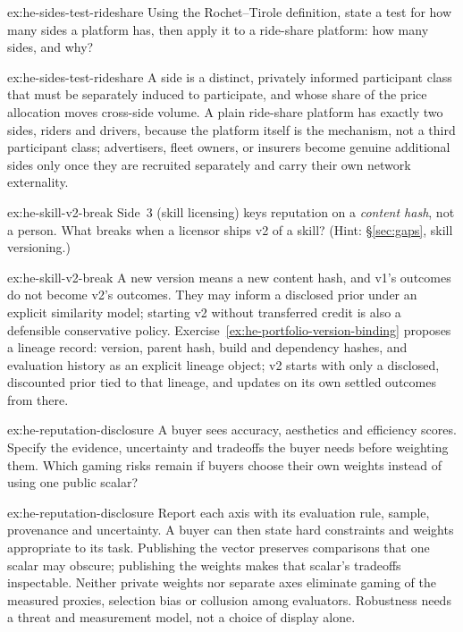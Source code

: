 \documentclass[11pt,a4paper]{article}
\theoremstyle{definition}
\theoremstyle{definition}
\theoremstyle{remark}
\begin{document}
\begin{pdexercise}[kind=Check,rating=1]{ex:he-sides-test-rideshare}
Using the Rochet--Tirole definition, state a test for how many sides a
  platform has, then apply it to a ride-share platform: how many sides, and why?
\end{pdexercise}
\begin{pdsolution}{ex:he-sides-test-rideshare}
A side is a distinct, privately informed participant class that must be
separately induced to participate, and whose share of the price allocation moves
cross-side volume. A plain ride-share platform has exactly two sides, riders
and drivers, because the platform itself is the mechanism, not a third
participant class; advertisers, fleet owners, or insurers become genuine
additional sides only once they are recruited separately and carry their own
network externality.
\end{pdsolution}
\begin{pdexercise}[kind=Trace,rating=2]{ex:he-skill-v2-break}
Side~3 (skill licensing) keys reputation on a \emph{content hash}, not a
  person. What breaks when a licensor ships v2 of a skill? (Hint:
  \S\ref{sec:gaps}, skill versioning.)
\end{pdexercise}
\begin{pdsolution}{ex:he-skill-v2-break}
A new version means a new content hash, and v1's outcomes do not become v2's outcomes. They may inform a disclosed
prior under an explicit similarity model; starting v2 without transferred
credit is also a defensible conservative policy. Exercise~\ref{ex:he-portfolio-version-binding}
proposes a lineage record: version, parent hash, build and
dependency hashes, and evaluation history as an explicit lineage object; v2
starts with only a disclosed, discounted prior tied to that lineage, and updates
on its own settled outcomes from there.
\end{pdsolution}
\begin{pdexercise}[kind=Open,rating=3]{ex:he-reputation-disclosure}
A buyer sees accuracy, aesthetics and efficiency scores. Specify the evidence,
uncertainty and tradeoffs the buyer needs before weighting them. Which gaming
risks remain if buyers choose their own weights instead of using one public
scalar?
\end{pdexercise}
\begin{pdsolution}{ex:he-reputation-disclosure}
Report each axis with its evaluation rule, sample, provenance and uncertainty.
A buyer can then state hard constraints and weights appropriate to its task.
Publishing the vector preserves comparisons that one scalar may obscure;
publishing the weights makes that scalar's tradeoffs inspectable. Neither
private weights nor separate axes eliminate gaming of the measured proxies,
selection bias or collusion among evaluators. Robustness needs a threat and
measurement model, not a choice of display alone.
\end{pdsolution}
\end{document}
